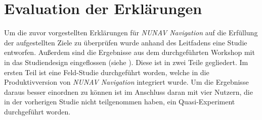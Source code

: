 \section{Evaluation der Erklärungen}

Um die zuvor vorgestellten Erklärungen für \textit{NUNAV Navigation} auf die Erfüllung der aufgestellten Ziele zu überprüfen wurde anhand des Leitfadens eine Studie entworfen. Außerdem sind die Ergebnisse aus dem durchgeführten Workshop mit in das Studiendesign eingeflossen (siehe ). Diese ist in zwei Teile gegliedert. Im ersten Teil ist eine Feld-Studie durchgeführt worden, welche in die Produktivversion von \textit{NUNAV Navigation} integriert wurde. Um die Ergebnisse daraus besser einordnen zu können ist im Anschluss daran mit vier Nutzern, die in der vorherigen Studie nicht teilgenommen haben, ein Quasi-Experiment durchgeführt worden.





